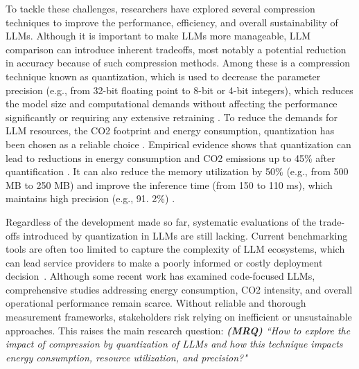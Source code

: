 To tackle these challenges, researchers have explored several compression techniques to improve the performance, efficiency, and overall sustainability of LLMs. Although it is important to make LLMs more manageable, LLM comparison can introduce inherent tradeoffs, most notably a potential reduction in accuracy because of such compression methods. Among these is a compression technique known as quantization, which is used to decrease the parameter precision (e.g., from 32-bit floating point to 8-bit or 4-bit integers), which reduces the model size and computational demands without affecting the performance significantly or requiring any extensive retraining \cite{DBLP:journals/corr/abs-2507-09665, 10968787}. To reduce the demands for LLM resources, the CO2 footprint and energy consumption, quantization has been chosen as a reliable choice \cite{DBLP:journals/corr/abs-2507-09665}. Empirical evidence shows that quantization can lead to reductions in energy consumption and CO2 emissions up to 45\% after quantification \cite{DBLP:journals/corr/abs-2504-06307}. It can also reduce the memory utilization by 50\% (e.g., from 500 MB to 250 MB) and improve the inference time (from 150 to 110 ms), which maintains high precision (e.g., 91. 2\%)  \cite{10968787}. 


Regardless of the development made so far, systematic evaluations of the trade-offs introduced by quantization in LLMs are still lacking. Current benchmarking tools are often too limited to capture the complexity of LLM ecosystems, which can lead service providers to make a poorly informed or costly deployment decision~\cite{10968787}.  Although some recent work has examined code-focused LLMs, comprehensive studies addressing energy consumption, CO2 intensity, and overall operational performance remain scarce. Without reliable and thorough measurement frameworks, stakeholders risk relying on inefficient or unsustainable approaches. This raises the main research question: \textit{\textbf{(MRQ)} ``How to explore the impact of compression by quantization of LLMs and how this technique impacts energy consumption, resource utilization, and precision?"}

